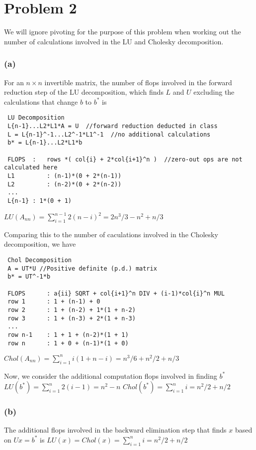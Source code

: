 \documentclass{article}
\begin{document}
\section*{Problem 2}

We will ignore pivoting for the purpose of this problem when working out the number of calculations 
involved in the LU and Cholesky decomposition. 

\subsubsection*{(a)}
For an $n\times n$ invertible matrix, the number of flops involved in the forward reduction step of
the LU decomposition, which finds $L$ and $U$ excluding the calculations that change $b$ to $b^*$ is
\begin{lstlisting}
 LU Decomposition
 L{n-1}...L2*L1*A = U  //forward reduction deducted in class
 L = L{n-1}^-1...L2^-1*L1^-1  //no additional calculations
 b* = L{n-1}...L2*L1*b

 FLOPS	:	rows *( col{i} + 2*col{i+1}^n )  //zero-out ops are not calculated here
 L1			: (n-1)*(0 + 2*(n-1))
 L2			: (n-2)*(0 + 2*(n-2))
 ...
 L{n-1}	: 1*(0 + 1)
\end{lstlisting}
$LU(A_{nn}) = \sum_{i=1}^{n-1} 2(n-i)^2 = 2n^3/3 - n^2 + n/3$

\hbox{}
Comparing this to the number of caculations involved in the Cholesky decomposition, we have
\begin{lstlisting}
 Chol Decomposition
 A = UT*U //Positive definite (p.d.) matrix
 b* = UT^-1*b

 FLOPS		: a{ii} SQRT + col{i+1}^n DIV + (i-1)*col{i}^n MUL
 row 1		: 1 + (n-1) + 0
 row 2		: 1 + (n-2) + 1*(1 + n-2)
 row 3		: 1 + (n-3) + 2*(1 + n-3)
 ...
 row n-1	: 1 + 1 + (n-2)*(1 + 1)
 row n		: 1 + 0 + (n-1)*(1 + 0)
\end{lstlisting}
$Chol(A_{nn}) = \sum_{i=1}^n i(1 + n-i) = n^3/6 + n^2/2 + n/3$ 

\hbox{}
Now, we consider the additional computation flops involved in finding $b^*$
\newline
\hbox{}
\newline
$LU(b^*)  = \sum_{i=1}^n 2(i-1) = n^2 - n$
\newline
$Chol(b^*)  = \sum_{i=1}^n i  = n^2/2 + n/2$


\subsubsection*{(b)}
The additional flops involved in the backward elimination step that finds $x$ based on
$Ux=b^*$ is \newline
$LU(x) = Chol(x) = \sum_{i=1}^n i  = n^2/2 + n/2$
\end{document}
